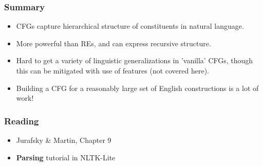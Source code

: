 \begin{frame}[fragile]
  \frametitle{Summary}

  \begin{itemize}
    \item CFGs capture hierarchical structure of constituents in
          natural language.
        
    \item More powerful than REs, and can express recursive
          structure.

    \item Hard to get a variety of linguistic generalizations in
          'vanilla' CFGs, though this can be mitigated with use of
          features (not covered here).


     \item Building a CFG for a reasonably large set of English
           constructions is a lot of work!

  \end{itemize}

\end{frame}

% 


\begin{frame}[fragile]
  \frametitle{Reading}

  \begin{itemize}
    \item {\Large Jurafsky \& Martin, Chapter 9}
    \item  {\Large \textbf{Parsing} tutorial in NLTK-Lite}
  \end{itemize}

\end{frame}

% 










